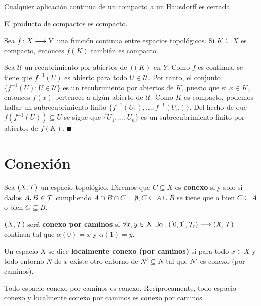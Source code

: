 \documentclass[GTS.tex]{subfiles}
\begin{document}
\begin{prop}\label{125}
Cualquier aplicación continua de un compacto a un Hausdorff es cerrada.
\end{prop}

\begin{teorema}[Tychonoff]
El producto de compactos es compacto.
\end{teorema}

\begin{teorema}
Sea $f\colon{X}\longrightarrow{Y}$ una función continua entre espacios topológicos. Si $K\subseteq X$ es compacto, entonces $f(K)$ también es compacto.
\end{teorema}

\begin{dem}
Sea $\mathcal{U}$ un recubrimiento por abiertos de $f(K)$ en $Y$. Como $f$ es continua, se tiene que $f^{-1}(U)$ es abierto para todo $U\in\mathcal{U}$. Por tanto, el conjunto $\{f^{-1}(U):U\in\mathcal{U}\}$ es un recubrimiento por abiertos de $K$, puesto que si $x\in K$, entonces $f(x)$ pertenece a algún abierto de $\mathcal{U}$. Como $K$ es compacto, podemos hallar un subrecubrimiento finito $\{f^{-1}(U_1),\dots, f^{-1}(U_n)\}$. Del hecho de que $f(f^{-1}(U))\subseteq U$ se sigue que $\{U_1,\dots, U_n\}$ es un subrecubrimiento finito por abiertos de $f(K)$. $\QED$
\end{dem}

\section{Conexión}
\begin{defi} Sea $(X,\mathcal{T})$ un espacio topológico. Diremos que $C\subseteq X$ es \textbf{conexo} si y solo si dados $A,B\in\mathcal{T}$ cumpliendo $A\cap B\cap C=\emptyset, C\subseteq A\cup B$ se tiene que o bien $C\subseteq A$ o bien $C\subseteq B$.
\end{defi}
\begin{defi} $(X,\mathcal{T})$ será \textbf{conexo por caminos} si $\forall x,y\in X\ \exists\alpha\func{([0,1],\Tau_e)}{(X,\Tau)}$ continua tal que $\alpha(0)=x$ y $\alpha(1)=y$.
\end{defi}

\begin{defi}
Un espacio $X$ se dice \textbf{localmente conexo (por caminos)} si para todo $x\in X$ y todo entorno $N$ de $x$ existe otro entorno de $N'\subseteq N$ tal que $N'$ es conexo (por caminos).
\end{defi}
\begin{prop} Todo espacio conexo por caminos es conexo. Recíprocamente, todo espacio conexo y localmente conexo por caminos es conexo por caminos.
\end{prop}
\end{document}
